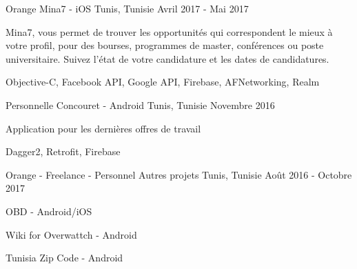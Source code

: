 \begin{cventries}
    
    \cventrydetailed
    {Orange} %
    {Mina7 - iOS} %
    {Tunis, Tunisie} %
    {Avril 2017 - Mai 2017} %
    {
    	\begin{cvitems} %
    		\item {Mina7, vous permet de trouver les opportunités qui correspondent le mieux à votre profil, pour des bourses, programmes de master, conférences ou poste universitaire. Suivez l'état de votre candidature et les dates de candidatures.}
    	\end{cvitems}
    }
    {Objective-C, Facebook API, Google API, Firebase, AFNetworking, Realm} %
    
 \cventrydetailed
    {Personnelle} %
    {Concouret - Android} %
    {Tunis, Tunisie} %
    {Novembre 2016} %
    {
    	\begin{cvitems} %
    		\item {Application pour les dernières offres de travail}
    	\end{cvitems}
    }
    {Dagger2, Retrofit, Firebase} %
    
    \cventry
    {Orange - Freelance - Personnel} %
    {Autres projets} %
    {Tunis, Tunisie} %
    {Août 2016 - Octobre 2017} %
    {
    	\begin{cvitems} %
    		\item {OBD - Android/iOS}
    		\item {Wiki for Overwattch - Android}
    		\item {Tunisia Zip Code - Android}
    	\end{cvitems}
    }

\end{cventries}
